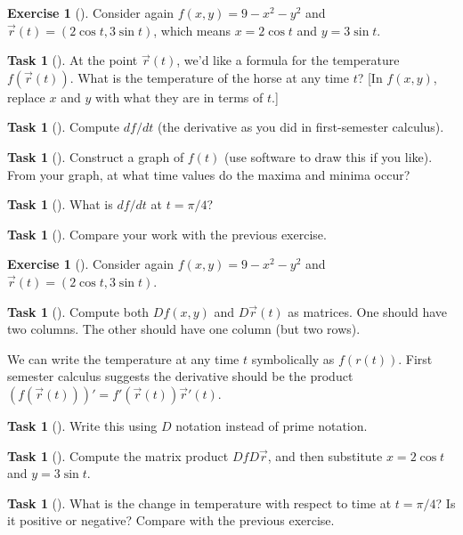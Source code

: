 \documentclass[10pt,]{book}
\theoremstyle{plain}
\theoremstyle{definition}
\theoremstyle{definition}
\theoremstyle{definition}
\theoremstyle{definition}
\newtheorem{exploration}[project]{Exercise}
\newtheorem{task}[project]{Task}
\theoremstyle{definition}
\numberwithin{equation}{section}
\begin{document}
\begin{exploration}[]\label{exploration-152}
Consider again \(f(x,y)=9-x^2-y^2\) and \(\vec r(t)=(2\cos t, 3\sin t)\), which means \(x=2\cos t\) and \(y=3\sin t\).%
\begin{task}[]\label{task-348}
At the point \(\vec r(t)\), we'd like a formula for the temperature \(f(\vec r(t))\). What is the temperature of the horse at any time \(t\)? [In \(f(x,y)\), replace \(x\) and \(y\) with what they are in terms of \(t\).]%
\end{task}
\begin{task}[]\label{task-349}
Compute \(df/dt\) (the derivative as you did in first-semester calculus).%
\end{task}
\begin{task}[]\label{task-350}
Construct a graph of \(f(t)\) (use software to draw this if you like). From your graph, at what time values do the maxima and minima occur?%
\end{task}
\begin{task}[]\label{task-351}
What is \(df/dt\) at \(t=\pi/4\)?%
\end{task}
\begin{task}[]\label{task-352}
Compare your work with the previous exercise.%
\end{task}
\end{exploration}
\begin{exploration}[]\label{exploration-153}
Consider again \(f(x,y)=9-x^2-y^2\) and \(\vec r(t)=(2\cos t, 3\sin t)\).%
\begin{task}[]\label{task-353}
Compute both \(Df(x,y)\) and \(D\vec r(t)\) as matrices. One should have two columns.  The other should have one column (but two rows).%
\end{task}
We can write the temperature at any time \(t\) symbolically as \(f(r(t))\). First semester calculus suggests the derivative should be the product \((f(\vec r(t))) ' = f'(\vec r(t))\vec r'(t)\).%
\begin{task}[]\label{task-354}
Write this using \(D\) notation instead of prime notation.%
\end{task}
\begin{task}[]\label{task-355}
Compute the matrix product \(DfD\vec r\), and then substitute \(x=2\cos t\) and \(y=3\sin t\).%
\end{task}
\begin{task}[]\label{task-356}
What is the change in temperature with respect to time at \(t=\pi/4\)? Is it positive or negative? Compare with the previous exercise.%
\end{task}
\end{exploration}
\end{document}
